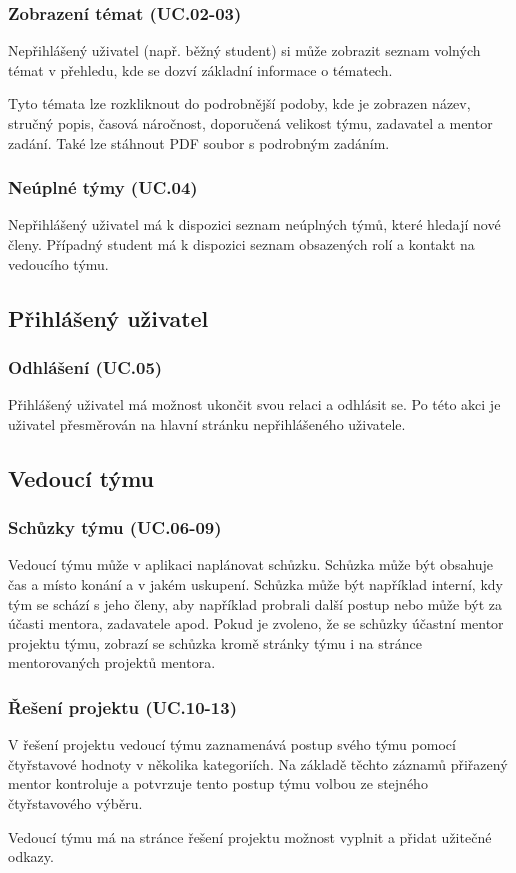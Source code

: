 \documentclass[czech,BP]{thesiskiv}
\begin{document}
			\subsubsection{Zobrazení témat (UC.02-03)}
				\par Nepřihlášený uživatel (např. běžný student) si může zobrazit seznam volných témat v přehledu, kde se dozví základní informace o tématech.
				\par Tyto témata lze rozkliknout do podrobnější podoby, kde je zobrazen název, stručný popis, časová náročnost, doporučená velikost týmu, zadavatel a mentor zadání. Také lze stáhnout PDF soubor s podrobným zadáním.
			\subsubsection{Neúplné týmy (UC.04)}
				\par Nepřihlášený uživatel má k dispozici seznam neúplných týmů, které hledají nové členy. Případný student má k dispozici seznam obsazených rolí a kontakt na vedoucího týmu.
		\subsection{Přihlášený uživatel}
			\subsubsection{Odhlášení (UC.05)}
				\par Přihlášený uživatel má možnost ukončit svou relaci a odhlásit se. Po této akci je uživatel přesměrován na hlavní stránku nepřihlášeného uživatele.
		\subsection{Vedoucí týmu}
			\subsubsection{Schůzky týmu (UC.06-09)}
				\par Vedoucí týmu může v aplikaci naplánovat schůzku. Schůzka může být obsahuje čas a místo konání a v jakém uskupení. Schůzka může být například interní, kdy tým se schází s jeho členy, aby například probrali další postup nebo může být za účasti mentora, zadavatele apod. Pokud je zvoleno, že se schůzky účastní mentor projektu týmu, zobrazí se schůzka kromě stránky týmu i na stránce mentorovaných projektů mentora.
			\subsubsection{Řešení projektu (UC.10-13)}
				\par V řešení projektu vedoucí týmu zaznamenává postup svého týmu pomocí čtyřstavové hodnoty v několika kategoriích. Na základě těchto záznamů přiřazený mentor kontroluje a potvrzuje tento postup týmu volbou ze stejného čtyřstavového výběru.
				\par Vedoucí týmu má na stránce řešení projektu možnost vyplnit a přidat užitečné odkazy.
\end{document}
